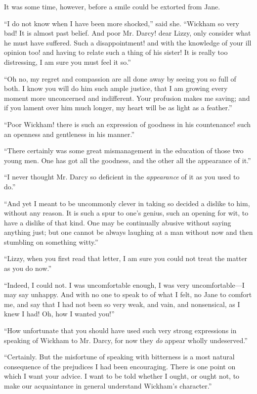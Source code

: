 It was some time, however, before a smile could be extorted from Jane.

``I do not know when I have been more shocked,'' said she. ``Wickham so very bad! It is almost past belief. And poor Mr. Darcy! dear Lizzy, only consider what he must have suffered. Such a disappointment! and with the knowledge of your ill opinion too! and having to relate such a thing of his sister! It is really too distressing, I am sure you must feel it so.''

``Oh no, my regret and compassion are all done away by seeing you so full of both. I know you will do him such ample justice, that I am growing every moment more unconcerned and indifferent. Your profusion makes me saving; and if you lament over him much longer, my heart will be as light as a feather.''

``Poor Wickham! there is such an expression of goodness in his countenance! such an openness and gentleness in his manner.''

``There certainly was some great mismanagement in the education of those two young men. One has got all the goodness, and the other all the appearance of it.''

``I never thought Mr. Darcy so deficient in the \textit{appearance} of it as you used to do.''

``And yet I meant to be uncommonly clever in taking so decided a dislike to him, without any reason. It is such a spur to one's genius, such an opening for wit, to have a dislike of that kind. One may be continually abusive without saying anything just; but one cannot be always laughing at a man without now and then stumbling on something witty.''

``Lizzy, when you first read that letter, I am sure you could not treat the matter as you do now.''

``Indeed, I could not. I was uncomfortable enough, I was very uncomfortable---I may say unhappy. And with no one to speak to of what I felt, no Jane to comfort me, and say that I had not been so very weak, and vain, and nonsensical, as I knew I had! Oh, how I wanted you!''

``How unfortunate that you should have used such very strong expressions in speaking of Wickham to Mr. Darcy, for now they \textit{do} appear wholly undeserved.''

``Certainly. But the misfortune of speaking with bitterness is a most natural consequence of the prejudices I had been encouraging. There is one point on which I want your advice. I want to be told whether I ought, or ought not, to make our acquaintance in general understand Wickham's character.''


